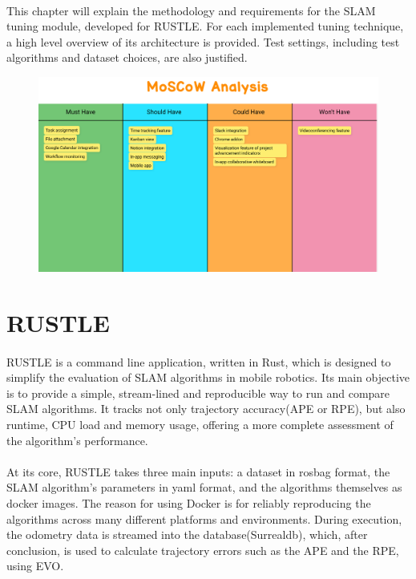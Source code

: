 \paragraph{}This chapter will explain the methodology and requirements for the \ac{SLAM} tuning module, developed for \ac{RUSTLE}. For each implemented tuning technique, a high level overview of its architecture is provided. Test settings, including test algorithms and dataset choices, are also justified.

\begin{figure}[h]
\includegraphics[width=0.85\linewidth]{images/moscow.png}
\end{figure}

\section{\ac{RUSTLE}}

\paragraph{}\ac{RUSTLE} is a command line application, written in Rust, which is designed to simplify the evaluation of SLAM algorithms in mobile robotics.
Its main objective is to provide a simple, stream-lined and reproducible way to run and compare SLAM algorithms. It tracks not only trajectory accuracy(APE or RPE), but also runtime, CPU load and memory usage, offering a more complete assessment of the algorithm's performance.

\paragraph{}At its core, RUSTLE takes three main inputs: a dataset in rosbag format, the SLAM algorithm's parameters in yaml format, and the algorithms themselves as docker images. The reason for using Docker is for reliably reproducing the algorithms across many different platforms and environments.
During execution, the odometry data is streamed into the database(Surrealdb), which, after conclusion, is used to calculate trajectory errors such as the APE and the RPE, using EVO.


